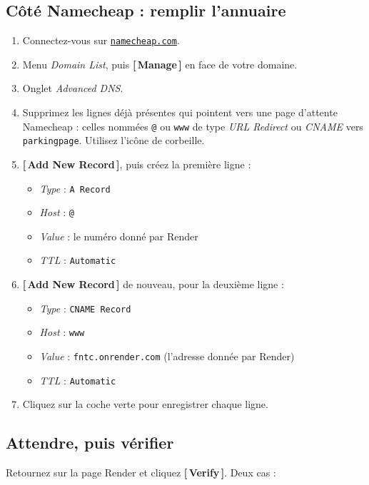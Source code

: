 \documentclass[11pt,a4paper]{article}
\newcommand{\bouton}[1]{\textbf{\textcolor{sig}{[\,#1\,]}}}
\newcommand{\champ}[1]{\textit{#1}}
\newcommand{\saisir}[1]{\texttt{#1}}
\newcommand{\lien}[2]{\href{#1}{\texttt{#2}}}
\begin{document}
\subsection{Côté Namecheap : remplir l'annuaire}

\begin{enumerate}
  \item Connectez-vous sur \lien{https://www.namecheap.com}{namecheap.com}.
  \item Menu \champ{Domain List}, puis \bouton{Manage} en face de votre domaine.
  \item Onglet \champ{Advanced DNS}.
  \item Supprimez les lignes déjà présentes qui pointent vers une page
        d'attente Namecheap : celles nommées \saisir{@} ou \saisir{www} de type
        \champ{URL Redirect} ou \champ{CNAME} vers \saisir{parkingpage}.
        Utilisez l'icône de corbeille.
  \item \bouton{Add New Record}, puis créez la première ligne :
  \begin{itemize}
    \item \champ{Type} : \saisir{A Record}
    \item \champ{Host} : \saisir{@}
    \item \champ{Value} : le numéro donné par Render
    \item \champ{TTL} : \saisir{Automatic}
  \end{itemize}
  \item \bouton{Add New Record} de nouveau, pour la deuxième ligne :
  \begin{itemize}
    \item \champ{Type} : \saisir{CNAME Record}
    \item \champ{Host} : \saisir{www}
    \item \champ{Value} : \saisir{fntc.onrender.com} (l'adresse donnée par Render)
    \item \champ{TTL} : \saisir{Automatic}
  \end{itemize}
  \item Cliquez sur la coche verte pour enregistrer chaque ligne.
\end{enumerate}

\subsection{Attendre, puis vérifier}

Retournez sur la page Render et cliquez \bouton{Verify}. Deux cas :
\end{document}

